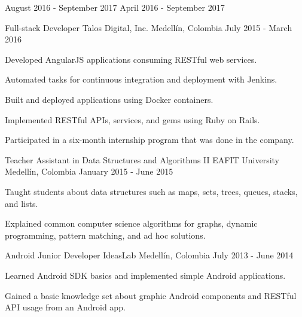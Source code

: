 \begin{cventries}
{\begin{cvitems}
      \end{cvitems}
      \begin{cvsubentries}
                      {August 2016 - September 2017}{}
                      {April 2016 - September 2017}{}
      \end{cvsubentries}
    }
  \cventry
    {Full-stack Developer}
    {Talos Digital, Inc.}
    {Medellín, Colombia}
    {July 2015 - March 2016}
    {
      \begin{cvitems}
        \item {Developed AngularJS applications consuming RESTful web services.}
        \item {Automated tasks for continuous integration and deployment with Jenkins.}
        \item {Built and deployed applications using Docker containers.}
        \item {Implemented RESTful APIs, services, and gems using Ruby on Rails.}
        \item {Participated in a six-month internship program that was done in the company.}
      \end{cvitems}
    }
  \cventry
    {Teacher Assistant in Data Structures and Algorithms II}
    {EAFIT University}
    {Medellín, Colombia}
    {January 2015 - June 2015}
    {
      \begin{cvitems}
        \item {Taught students about data structures such as maps, sets, trees, queues, stacks, and lists.}
        \item {Explained common computer science algorithms for graphs, dynamic programming, pattern matching, and ad hoc solutions.}
      \end{cvitems}
    }
  \cventry
    {Android Junior Developer}
    {IdeasLab}
    {Medellín, Colombia}
    {July 2013 - June 2014}
    {
      \begin{cvitems}
        \item {Learned Android SDK basics and implemented simple Android applications.}
        \item {Gained a basic knowledge set about graphic Android components and RESTful API usage from an Android app.}
      \end{cvitems}
    }
\end{cventries}
